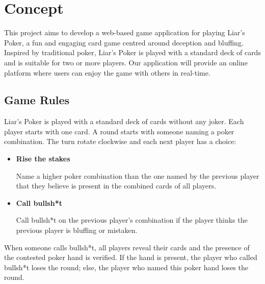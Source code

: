 \documentclass{scrartcl}
\begin{document}

\section{Concept}\label{concept}


This project aims to develop a web-based game application for playing Liar's Poker, a fun and engaging
card game centred around deception and bluffing. Inspired by traditional poker, Liar's Poker is played
with a standard deck of cards and is suitable for two or more players. Our application will provide an
online platform where users can enjoy the game with others in real-time.

\subsection{Game Rules}\label{game-rules}
Liar's Poker is played with a standard deck of cards without any joker. Each player starts with one
card. A round starts with someone naming a poker combination. The turn rotate clockwise and each
next player has a choice:
\begin{itemize}
      \item \textbf{Rise the stakes}\par
            Name a higher poker combination than the one named by the previous player that
            they believe is present in the combined cards of all players.
      \item \textbf{Call bullsh*t} \par
            Call bullsh*t on the previous player's combination if the player thinks the previous
            player is bluffing or mistaken.
\end{itemize}
When someone calls bullsh*t, all players reveal their cards and the presence of the contested poker
hand is verified. If the hand is present, the player who called bullsh*t loses the round; else, the
player who named this poker hand loses the round.
\end{document}
